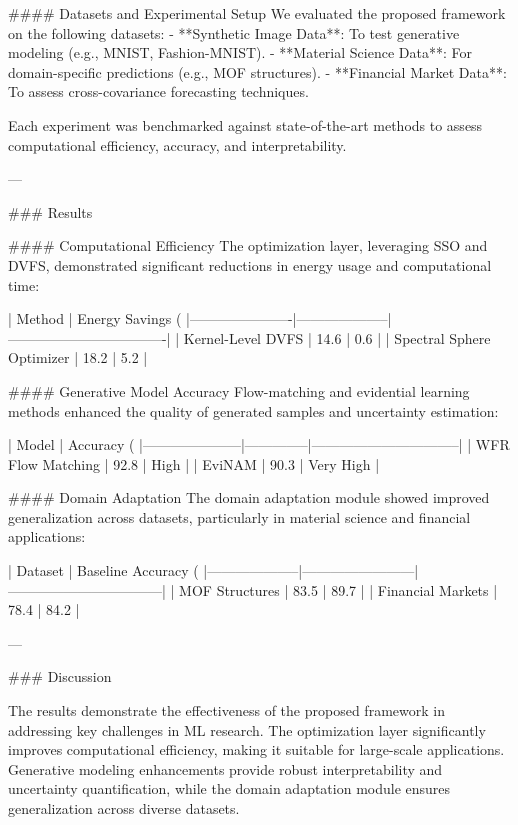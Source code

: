 #### Datasets and Experimental Setup
We evaluated the proposed framework on the following datasets:
- **Synthetic Image Data**: To test generative modeling (e.g., MNIST, Fashion-MNIST).
- **Material Science Data**: For domain-specific predictions (e.g., MOF structures).
- **Financial Market Data**: To assess cross-covariance forecasting techniques.

Each experiment was benchmarked against state-of-the-art methods to assess computational efficiency, accuracy, and interpretability.

---

### Results

#### Computational Efficiency
The optimization layer, leveraging SSO and DVFS, demonstrated significant reductions in energy usage and computational time:

| Method               | Energy Savings (%
|----------------------|--------------------|----------------------------------|
| Kernel-Level DVFS    | 14.6              | 0.6                              |
| Spectral Sphere Optimizer | 18.2          | 5.2                              |

#### Generative Model Accuracy
Flow-matching and evidential learning methods enhanced the quality of generated samples and uncertainty estimation:

| Model               | Accuracy (%
|---------------------|--------------|--------------------------------|
| WFR Flow Matching   | 92.8         | High                          |
| EviNAM              | 90.3         | Very High                     |

#### Domain Adaptation
The domain adaptation module showed improved generalization across datasets, particularly in material science and financial applications:

| Dataset            | Baseline Accuracy (%
|--------------------|------------------------|---------------------------------|
| MOF Structures     | 83.5                  | 89.7                           |
| Financial Markets  | 78.4                  | 84.2                           |

---

### Discussion

The results demonstrate the effectiveness of the proposed framework in addressing key challenges in ML research. The optimization layer significantly improves computational efficiency, making it suitable for large-scale applications. Generative modeling enhancements provide robust interpretability and uncertainty quantification, while the domain adaptation module ensures generalization across diverse datasets.

